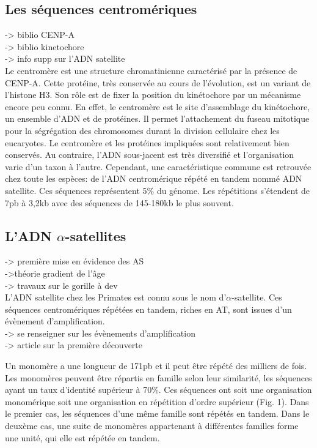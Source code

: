 \documentclass[12pt,a4paper]{article}
\begin{document}
\subsection{Les séquences centromériques}
-> biblio CENP-A\\
-> biblio kinetochore\\
-> info supp sur l'ADN satellite\\

Le centromère est une structure chromatinienne caractérisé par la présence de CENP-A. Cette protéine, très conservée au cours de l'évolution, est un variant de l'histone H3. Son rôle est de fixer la position du kinétochore par un mécanisme encore peu connu. En effet, le centromère est le site d'assemblage du kinétochore, un ensemble d'ADN et de protéines. Il permet l'attachement du fuseau mitotique pour la ségrégation des chromosomes durant la division cellulaire chez les eucaryotes. Le centromère et les protéines impliquées sont relativement bien conservés. Au contraire, l'ADN sous-jacent est très diversifié et l'organisation varie d'un taxon à l'autre. Cependant, une caractéristique commune est retrouvée chez toute les espèces: de l'ADN centromérique répété en tandem nommé ADN satellite. Ces séquences représentent 5\% du génome. Les répétitions s'étendent de 7pb à 3,2kb avec des séquences de 145-180kb le plus souvent.  

\subsection{L'ADN $\alpha$-satellites}
-> première mise en évidence des AS\\
->théorie gradient de l'âge\\
-> travaux sur le gorille à dev\\

L'ADN satellite chez les Primates est connu sous le nom d'$\alpha$-satellite. Ces séquences centromériques répétées en tandem, riches en AT, sont issues d'un évènement d'amplification. \\
-> se renseigner sur les évènements d'amplification\\
-> article sur la première découverte

Un monomère a une longueur de 171pb et il peut être répété des milliers de fois. Les monomères peuvent être répartis en famille selon leur similarité, les séquences ayant un taux d'identité supérieur à 70\%. Ces séquences ont soit une organisation monomérique soit une organisation en répétition d'ordre supérieur (Fig. 1). Dans le premier cas, les séquences d'une même famille sont répétés en tandem. Dans le deuxème cas, une suite de monomères appartenant à différentes familles forme une unité, qui elle est répétée en tandem. 
\end{document}
